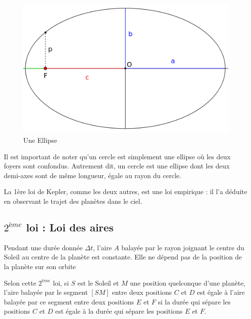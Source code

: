 \documentclass[11pt,a4paper]{article}
\begin{document}
\begin{figure}[ht]
    \centering
    \includegraphics[width=0.65\linewidth]{imgs/p3/ellipse.png}
    \caption{Une Ellipse}
    \label{fig:ellipse}
\end{figure}


Il est important de noter qu’un cercle est simplement une ellipse où les deux foyers sont confondus. Autrement dit, un cercle est une ellipse dont les deux demi-axes sont de même longueur, égale au rayon du cercle. 

La 1ère loi de Kepler, comme les deux autres, est une loi empirique : il l’a déduite en observant le trajet des planètes dans le ciel. 


\subsection{$2^{ème}$ loi : Loi des aires}

\begin{shaded}
Pendant une durée donnée $\Delta t$, l’aire $A$ balayée par le rayon joignant le centre du Soleil au centre de la planète est constante. Elle ne dépend pas de la position de la planète sur son orbite
\end{shaded}

Selon cette $2^{ème}$ loi, si $S$ est le Soleil et $M$ une position quelconque d'une planète, l'aire balayée par le segment $[SM]$ entre deux positions $C$ et $D$ est égale à l'aire balayée par ce segment entre deux positions $E$ et $F$ si la durée qui sépare les positions $C$ et $D$ est égale à la durée qui sépare les positions $E$ et $F$. 
\end{document}
